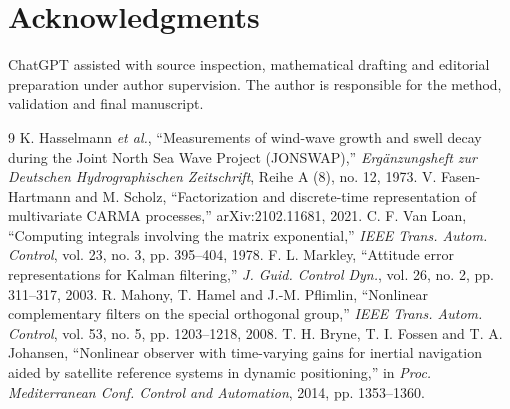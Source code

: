 \documentclass[conference]{IEEEtran}
\begin{document}
\section*{Acknowledgments}
ChatGPT assisted with source inspection, mathematical drafting and
editorial preparation under author supervision. The author is responsible
for the method, validation and final manuscript.

\begin{thebibliography}{9}
K. Hasselmann \emph{et al.}, ``Measurements of wind-wave growth and swell
decay during the Joint North Sea Wave Project (JONSWAP),''
\emph{Erg\"anzungsheft zur Deutschen Hydrographischen Zeitschrift},
Reihe A (8), no. 12, 1973.
V. Fasen-Hartmann and M. Scholz, ``Factorization and discrete-time
representation of multivariate CARMA processes,'' arXiv:2102.11681, 2021.
C. F. Van Loan, ``Computing integrals involving the matrix exponential,''
\emph{IEEE Trans. Autom. Control}, vol. 23, no. 3, pp. 395--404, 1978.
F. L. Markley, ``Attitude error representations for Kalman filtering,''
\emph{J. Guid. Control Dyn.}, vol. 26, no. 2, pp. 311--317, 2003.
R. Mahony, T. Hamel and J.-M. Pflimlin, ``Nonlinear complementary filters
on the special orthogonal group,'' \emph{IEEE Trans. Autom. Control},
vol. 53, no. 5, pp. 1203--1218, 2008.
T. H. Bryne, T. I. Fossen and T. A. Johansen, ``Nonlinear observer with
time-varying gains for inertial navigation aided by satellite reference
systems in dynamic positioning,'' in \emph{Proc. Mediterranean Conf.
Control and Automation}, 2014, pp. 1353--1360.
\end{thebibliography}
\end{document}
